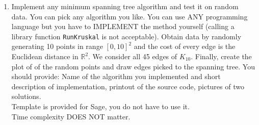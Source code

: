\documentclass[11pt, oneside]{article}
\begin{document}
\begin{enumerate}
  \item %
    Implement any minimum spanning tree algorithm and test it on random data.
    You can pick any algorithm you like. You can use ANY programming language but you have to IMPLEMENT the method yourself (calling a library function \texttt{RunKruskal} is not acceptable).
    Obtain data by randomly generating 10 points in range $[0,10]^2$ and the cost of every edge is the Euclidean distance in $\mathbb{R}^2$.
    We consider all 45 edges of $K_{10}$.
    Finally, create the plot of of the random points and draw edges picked to the spanning tree. You should provide: Name of the algorithm you implemented and short description of implementation, printout of the source code, pictures of two solutions.\\
    Template is provided for Sage, you do not have to use it.\\
    Time complexity DOES NOT matter. 
\end{enumerate}
\end{document}

